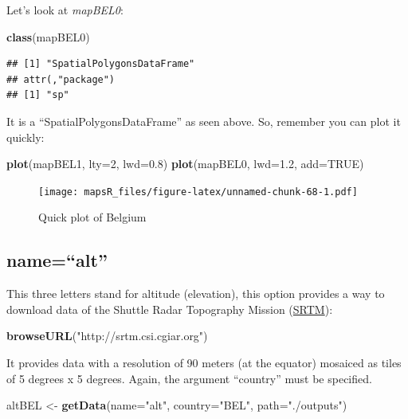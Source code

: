 \documentclass[]{report}
\newenvironment{Shaded}{\begin{snugshade}}{\end{snugshade}}
\newcommand{\KeywordTok}[1]{\textcolor[rgb]{0.13,0.29,0.53}{\textbf{{#1}}}}
\newcommand{\DataTypeTok}[1]{\textcolor[rgb]{0.13,0.29,0.53}{{#1}}}
\newcommand{\DecValTok}[1]{\textcolor[rgb]{0.00,0.00,0.81}{{#1}}}
\newcommand{\FloatTok}[1]{\textcolor[rgb]{0.00,0.00,0.81}{{#1}}}
\newcommand{\StringTok}[1]{\textcolor[rgb]{0.31,0.60,0.02}{{#1}}}
\newcommand{\OtherTok}[1]{\textcolor[rgb]{0.56,0.35,0.01}{{#1}}}
\newcommand{\NormalTok}[1]{{#1}}
\begin{document}
Let's look at \emph{mapBEL0}:

\begin{Shaded}
\begin{Highlighting}[]
\KeywordTok{class}\NormalTok{(mapBEL0)}
\end{Highlighting}
\end{Shaded}

\begin{verbatim}
## [1] "SpatialPolygonsDataFrame"
## attr(,"package")
## [1] "sp"
\end{verbatim}

It is a ``SpatialPolygonsDataFrame'' as seen above. So, remember you can
plot it quickly:

\begin{Shaded}
\begin{Highlighting}[]
\KeywordTok{plot}\NormalTok{(mapBEL1, }\DataTypeTok{lty=}\DecValTok{2}\NormalTok{, }\DataTypeTok{lwd=}\FloatTok{0.8}\NormalTok{)}
\KeywordTok{plot}\NormalTok{(mapBEL0, }\DataTypeTok{lwd=}\FloatTok{1.2}\NormalTok{, }\DataTypeTok{add=}\OtherTok{TRUE}\NormalTok{)}
\end{Highlighting}
\end{Shaded}

\begin{figure}[htbp]
\centering
\texttt{[image: mapsR\_files/figure-latex/unnamed-chunk-68-1.pdf]}
\caption{Quick plot of Belgium}
\end{figure}

\subsection{\texorpdfstring{name=``alt''}{name=alt}}\label{namealt}

This three letters stand for altitude (elevation), this option provides
a way to download data of the Shuttle Radar Topography Mission
(\href{http://srtm.csi.cgiar.org/}{SRTM}):

\begin{Shaded}
\begin{Highlighting}[]
\KeywordTok{browseURL}\NormalTok{(}\StringTok{"http://srtm.csi.cgiar.org"}\NormalTok{)}
\end{Highlighting}
\end{Shaded}

It provides data with a resolution of 90 meters (at the equator)
mosaiced as tiles of 5 degrees x 5 degrees. Again, the argument
``country'' must be specified.

\begin{Shaded}
\begin{Highlighting}[]
\NormalTok{altBEL <-}\StringTok{ }\KeywordTok{getData}\NormalTok{(}\DataTypeTok{name=}\StringTok{"alt"}\NormalTok{, }\DataTypeTok{country=}\StringTok{"BEL"}\NormalTok{, }\DataTypeTok{path=}\StringTok{"./outputs"}\NormalTok{)}
\end{Highlighting}
\end{Shaded}
\end{document}
